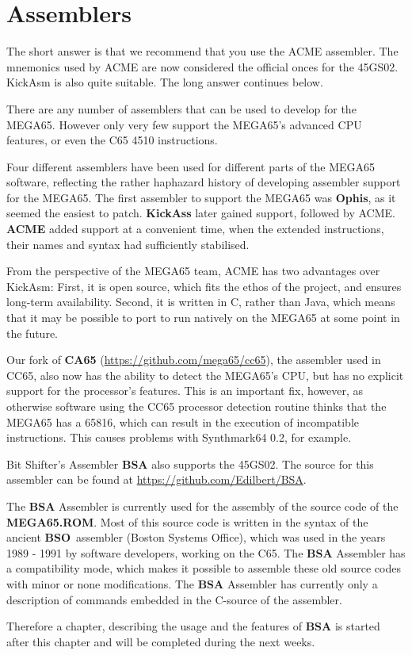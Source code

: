 \chapter{Assemblers}

The short answer is that we recommend that you use the ACME
assembler.  The mnemonics used by ACME are now considered the official
onces for the 45GS02.  KickAsm is also quite suitable. The long answer continues below.

There are any number of assemblers that can be used to develop for the
MEGA65.  However only very few support the MEGA65's advanced CPU
features, or even the C65 4510 instructions.

Four different
assemblers have been used for different parts of the MEGA65 software,
reflecting the rather haphazard history of developing assembler
support for the MEGA65.  The first assembler to support the MEGA65 was
{\bf Ophis}, as it seemed the easiest to patch.  {\bf KickAss} later gained
support, followed by ACME. {\bf ACME} added support at a convenient time, when
the extended instructions, their names and syntax had sufficiently stabilised.

From the perspective of the MEGA65 team, ACME has two advantages over KickAsm:
First, it is open source, which fits the ethos of the project, and ensures long-term
availability. Second, it is written in C, rather than Java, which means that
it may be possible to port to run natively on the MEGA65 at some point in
the future.

Our fork of {\bf CA65} (\url{https://github.com/mega65/cc65}), the assembler
used in CC65, also now has the ability
to detect the MEGA65's CPU, but has no explicit support for the
processor's features.  This is an important fix, however, as otherwise
software using the CC65 processor detection routine thinks that the
MEGA65 has a 65816, which can result in the execution of incompatible
instructions. This causes problems with Synthmark64 0.2, for example.

Bit Shifter's Assembler {\bf BSA} also supports the 45GS02.  The source
for this assembler can be found at \url{https://github.com/Edilbert/BSA}.

The {\bf BSA} Assembler is currently used for the assembly of the source code
of the {\bf MEGA65.ROM}. Most of this source code is written in the syntax
of the ancient {\bf BSO} assembler (Boston Systems Office), which was used in the
years 1989 - 1991 by software developers, working on the C65.
The {\bf BSA} Assembler has a compatibility mode, which makes it
possible to assemble these old source codes with minor or none modifications.
The {\bf BSA} Assembler has currently only a description of commands
embedded in the C-source of the assembler.

Therefore a chapter, describing the usage and the features of {\bf BSA}
is started after this chapter and will be completed during the next weeks.

